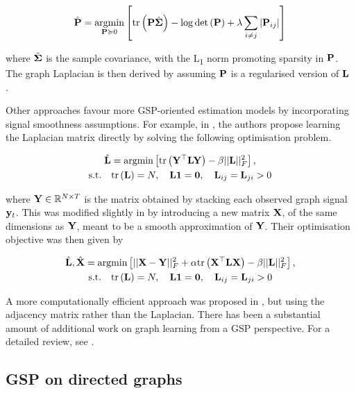 \begin{equation}
    \hat{\mathbf{P}} = \underset{\mathbf{P} \succcurlyeq 0}{\text{argmin}} \left[\text{\textup{tr}}\left(\mathbf{P} \hat{\mathbf{\Sigma}}\right) - \log \det \left(\mathbf{P}\right) + \lambda \sum_{i\neq j} |\mathbf{P}_{ij}|\right]
\end{equation}

where $\hat{\mathbf{\Sigma}}$ is the sample covariance, with the L\textsubscript{1} norm promoting sparsity in $\mathbf{P}$. The graph Laplacian is then derived by assuming $\mathbf{P}$ is a regularised version of $\mathbf{L}$ \citep{Lake2010}. 

Other approaches favour more GSP-oriented estimation models by incorporating signal smoothness assumptions. For example, in \cite{Hu2015}, the authors propose learning the Laplacian matrix directly by solving the following optimisation problem. 

\begin{equation}
    \begin{gathered}
        \hat{\mathbf{L}} = \text{argmin} \left[ \text{\textup{tr}}\left(\mathbf{Y}^\top \mathbf{L} \mathbf{Y}\right) - \beta ||\mathbf{L} ||_F^2 \right], \\ \text{s.t.} \quad \text{\textup{tr}}\left(\mathbf{L}\right) = N, \quad \mathbf{L} \mathbf{1} = \mathbf{0}, \quad \mathbf{L}_{ij} = \mathbf{L}_{ji} >0
    \end{gathered}
\end{equation}

where $\mathbf{Y} \in \mathbb{R}^{N \times T}$ is the matrix obtained by stacking each observed graph signal $\mathbf{y}_t$. This was modified slightly in \cite{Dong2016} by introducing a new matrix $\mathbf{X}$, of the same dimensions as $\mathbf{Y}$, meant to be a smooth approximation of $\mathbf{Y}$. Their optimisation objective was then given by 

\begin{equation}
    \begin{gathered}
        \hat{\mathbf{L}}, \hat{\mathbf{X}} = \text{argmin} \left[ ||\mathbf{X} - \mathbf{Y}||_F^2 + \alpha \text{\textup{tr}}\left(\mathbf{X}^\top \mathbf{L} \mathbf{X}\right) - \beta ||\mathbf{L} ||_F^2 \right], \\ \text{s.t.} \quad \text{\textup{tr}}\left(\mathbf{L}\right) = N, \quad \mathbf{L} \mathbf{1} = \mathbf{0}, \quad \mathbf{L}_{ij} = \mathbf{L}_{ji} > 0
    \end{gathered}
\end{equation}

A more computationally efficient approach was proposed in \cite{Kalofolias2016}, but using the adjacency matrix rather than the Laplacian. There has been a substantial amount of additional work on graph learning from a GSP perspective. For a detailed review, see \cite{Dong2019, Mateos2019}. 


\subsection{GSP on directed graphs}

